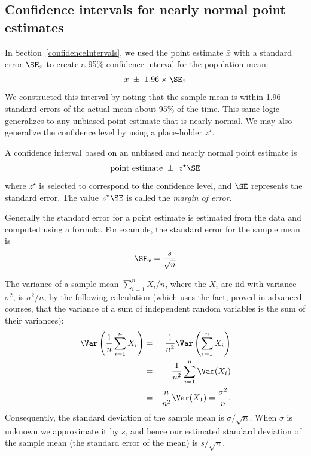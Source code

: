 \subsection{Confidence intervals for nearly normal point estimates}


In Section~\ref{confidenceIntervals}, we used the point estimate $\bar{x}$ with a standard error $\SE_{\bar{x}}$ to create a 95\% confidence interval for the population mean:
\begin{align}
\bar{x}\ \pm\ 1.96 \times \SE_{\bar{x}}
\label{95PercCIForMeanInGeneralizingSection}
\end{align}
We constructed this interval by noting that the sample mean is within 1.96 standard errors of the actual mean about 95\% of the time. This same logic generalizes to any unbiased point estimate that is nearly normal. We may also generalize the confidence level by using a place-holder $z^{\star}$.

\begin{termBox}{\label{generalConfidenceIntervalTermBox}%
A confidence interval based on an unbiased and nearly normal point estimate is
\begin{eqnarray}
\text{point estimate}\ \pm\ z^{\star}\SE
\label{95PercGeneralCIInGeneralizingSection}
\end{eqnarray}
where $z^{\star}$ is selected to correspond to the confidence level, and $\SE$ represents the standard error. The value $z^{\star}\SE$ is called the \emph{margin of error}.}
\end{termBox}

Generally the standard error for a point estimate is estimated from the data and computed using a formula. For example, the standard error for the sample mean is
\begin{eqnarray*}
\SE_{\bar{x}} = \frac{s}{\sqrt{n}}
\end{eqnarray*}

The variance of a sample mean $\sum_{i=1}^n X_i/n$, where the $X_i$ are iid with variance $\sigma^2$, is $\sigma^2/n$, by the following calculation (which uses the fact, proved in advanced courses, that the variance of a sum of independent random variables is the sum of their variances):
\begin{eqnarray*}
	\Var\left(\frac1n\sum_{i=1}^n X_i\right) &=& \frac1{n^2}\Var\left(\sum_{i=1}^n X_i\right)\\
	 &=& \frac1{n^2}\sum_{i=1}^n\Var(X_i)\\
	 &=& \frac{n}{n^2}\Var(X_1) = \frac{\sigma^2}n.
\end{eqnarray*}
Consequently, the standard deviation of the sample mean is $\sigma/\sqrt{n}$. When $\sigma$ is unknown we approximate it by $s$, and hence our estimated standard deviation of the sample mean (the standard error of the mean) is $s/\sqrt{n}$.



